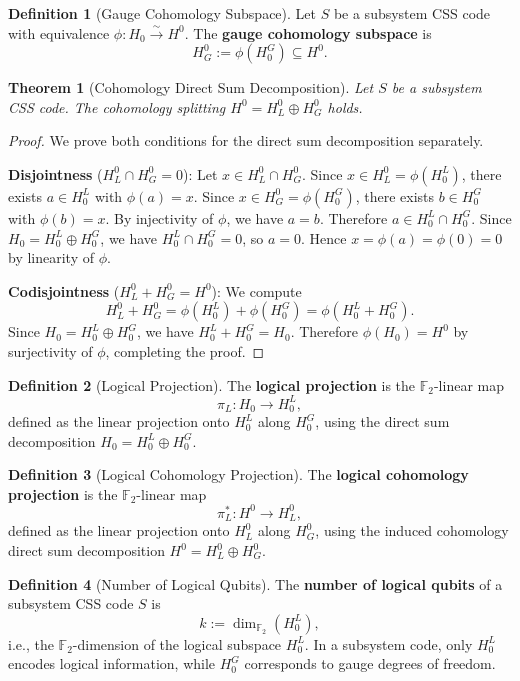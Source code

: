 \documentclass[11pt]{article}
\theoremstyle{plain}
\newtheorem*{theorem}{Theorem}
\theoremstyle{definition}
\newtheorem*{definition}{Definition}
\theoremstyle{remark}
\begin{document}
\begin{definition}[Gauge Cohomology Subspace]
Let $S$ be a subsystem CSS code with equivalence $\phi : H_0 \xrightarrow{\sim} H^0$. The \textbf{gauge cohomology subspace} is
\[
H^0_G := \phi(H_0^G) \subseteq H^0.
\]
\end{definition}

\begin{theorem}[Cohomology Direct Sum Decomposition]
Let $S$ be a subsystem CSS code. The cohomology splitting $H^0 = H^0_L \oplus H^0_G$ holds.
\end{theorem}

\begin{proof}
We prove both conditions for the direct sum decomposition separately.

\textbf{Disjointness} ($H^0_L \cap H^0_G = 0$): Let $x \in H^0_L \cap H^0_G$. Since $x \in H^0_L = \phi(H_0^L)$, there exists $a \in H_0^L$ with $\phi(a) = x$. Since $x \in H^0_G = \phi(H_0^G)$, there exists $b \in H_0^G$ with $\phi(b) = x$. By injectivity of $\phi$, we have $a = b$. Therefore $a \in H_0^L \cap H_0^G$. Since $H_0 = H_0^L \oplus H_0^G$, we have $H_0^L \cap H_0^G = 0$, so $a = 0$. Hence $x = \phi(a) = \phi(0) = 0$ by linearity of $\phi$.

\textbf{Codisjointness} ($H^0_L + H^0_G = H^0$): We compute
\[
H^0_L + H^0_G = \phi(H_0^L) + \phi(H_0^G) = \phi(H_0^L + H_0^G).
\]
Since $H_0 = H_0^L \oplus H_0^G$, we have $H_0^L + H_0^G = H_0$. Therefore $\phi(H_0) = H^0$ by surjectivity of $\phi$, completing the proof.
\end{proof}

\begin{definition}[Logical Projection]
The \textbf{logical projection} is the $\mathbb{F}_2$-linear map
\[
\pi_L : H_0 \longrightarrow H_0^L,
\]
defined as the linear projection onto $H_0^L$ along $H_0^G$, using the direct sum decomposition $H_0 = H_0^L \oplus H_0^G$.
\end{definition}

\begin{definition}[Logical Cohomology Projection]
The \textbf{logical cohomology projection} is the $\mathbb{F}_2$-linear map
\[
\pi_L^* : H^0 \longrightarrow H^0_L,
\]
defined as the linear projection onto $H^0_L$ along $H^0_G$, using the induced cohomology direct sum decomposition $H^0 = H^0_L \oplus H^0_G$.
\end{definition}

\begin{definition}[Number of Logical Qubits]
The \textbf{number of logical qubits} of a subsystem CSS code $S$ is
\[
k := \dim_{\mathbb{F}_2}(H_0^L),
\]
i.e., the $\mathbb{F}_2$-dimension of the logical subspace $H_0^L$. In a subsystem code, only $H_0^L$ encodes logical information, while $H_0^G$ corresponds to gauge degrees of freedom.
\end{definition}
\end{document}
